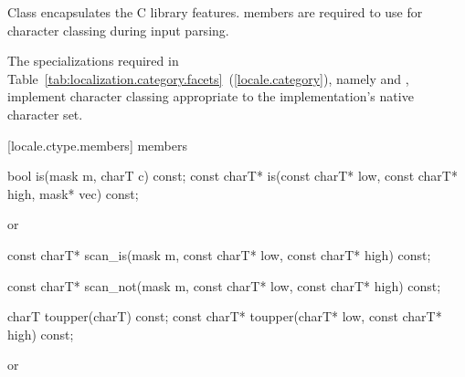 \pnum
Class
encapsulates the C library
features.
members are required to use
for character classing during input parsing.

\pnum
The specializations required in Table~\ref{tab:localization.category.facets}~(\ref{locale.category}), namely
and
,
implement character classing appropriate
to the implementation's native character set.

[locale.ctype.members]{ members}

%
\begin{itemdecl}
bool         is(mask m, charT c) const;
const charT* is(const charT* low, const charT* high,
                mask* vec) const;
\end{itemdecl}

\begin{itemdescr}
\pnum
\returns
{}
or
\end{itemdescr}

%
\begin{itemdecl}
const charT* scan_is(mask m,
                     const charT* low, const charT* high) const;
\end{itemdecl}

\begin{itemdescr}
\pnum
\returns
{}
\end{itemdescr}

%
\begin{itemdecl}
const charT* scan_not(mask m,
                      const charT* low, const charT* high) const;
\end{itemdecl}

\begin{itemdescr}
\pnum
\returns
{}
\end{itemdescr}

%
\begin{itemdecl}
charT        toupper(charT) const;
const charT* toupper(charT* low, const charT* high) const;
\end{itemdecl}

\begin{itemdescr}
\pnum
\returns
{}
or
\end{itemdescr}

